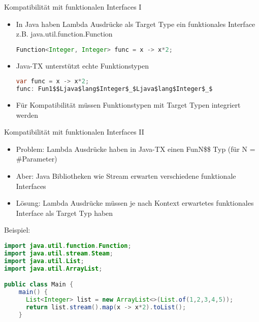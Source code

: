 \documentclass{beamer}
\begin{document}
\begin{frame}[fragile]{Kompatibilität mit funktionalen Interfaces I}
    \begin{itemize}
        \item In Java haben Lambda Ausdrücke als Target Type ein funktionales Interface z.B. java.util.function.Function
        \begin{lstlisting}[language=java]
Function<Integer, Integer> func = x -> x*2;
        \end{lstlisting}
        \item Java-TX unterstützt echte Funktionstypen 
        \begin{lstlisting}[language=java]
var func = x -> x*2;
func: Fun1$$Ljava$lang$Integer$_$Ljava$lang$Integer$_$
        \end{lstlisting}
        \item Für Kompatibilität müssen Funktionstypen mit Target Typen integriert werden
    \end{itemize}
\end{frame}

\begin{frame}[fragile]{Kompatibilität mit funktionalen Interfaces II}

    \begin{itemize}
        \item Problem: Lambda Ausdrücke haben in Java-TX einen FunN\$\$ Typ (für N = \#Parameter)
        \item Aber: Java Bibliotheken wie Stream erwarten verschiedene funktionale Interfaces
        \item Lösung: Lambda Ausdrücke müssen je nach Kontext erwartetes funktionales Interface als Target Typ haben
    \end{itemize}
Beispiel:
   \begin{lstlisting}[language=java]
import java.util.function.Function;
import java.util.stream.Steam;
import java.util.List;
import java.util.ArrayList;

public class Main {
    main() {
      List<Integer> list = new ArrayList<>(List.of(1,2,3,4,5));
      return list.stream().map(x -> x*2).toList();
    }
   \end{lstlisting} 

\end{frame}
\end{document}
